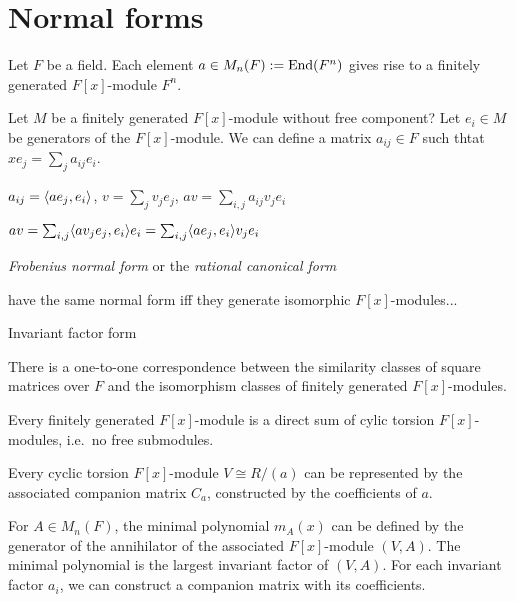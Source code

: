 \documentclass{../../large}
\begin{document}
\section{Normal forms}
\begin{prb}
Let $F$ be a field.
Each element $a\in M_n(F):=\operatorname{End}(F^n)$ gives rise to a finitely generated $F[x]$-module $F^n$.

Let $M$ be a finitely generated $F[x]$-module without free component?
Let $e_i\in M$ be generators of the $F[x]$-module.
We can define a matrix $a_{ij}\in F$ such thtat $xe_j=\sum_ja_{ij}e_i$.


$a_{ij}=\langle ae_j,e_i\rangle$, $v=\sum_jv_je_j$, $av=\sum_{i,j}a_{ij}v_je_i$

$av=\sum_{i,j}\langle av_je_j,e_i\rangle e_i=\sum_{i,j}\langle ae_j,e_i\rangle v_je_i$




\emph{Frobenius normal form} or the \emph{rational canonical form}

have the same normal form iff they generate isomorphic $F[x]$-modules...


Invariant factor form
\begin{parts}
\item There is a one-to-one correspondence between the similarity classes of square matrices over $F$ and the isomorphism classes of finitely generated $F[x]$-modules.
\item Every finitely generated $F[x]$-module is a direct sum of cylic torsion $F[x]$-modules, i.e.~no free submodules.
\item Every cyclic torsion $F[x]$-module $V\cong R/(a)$ can be represented by the associated companion matrix $C_a$, constructed by the coefficients of $a$.
\end{parts}
\end{prb}

For $A\in M_n(F)$, the minimal polynomial $m_A(x)$ can be defined by the generator of the annihilator of the associated $F[x]$-module $(V,A)$.
The minimal polynomial is the largest invariant factor of $(V,A)$.
For each invariant factor $a_i$, we can construct a companion matrix with its coefficients.

\begin{pf}

\end{pf}


\begin{prb}
\end{prb}
\end{document}
